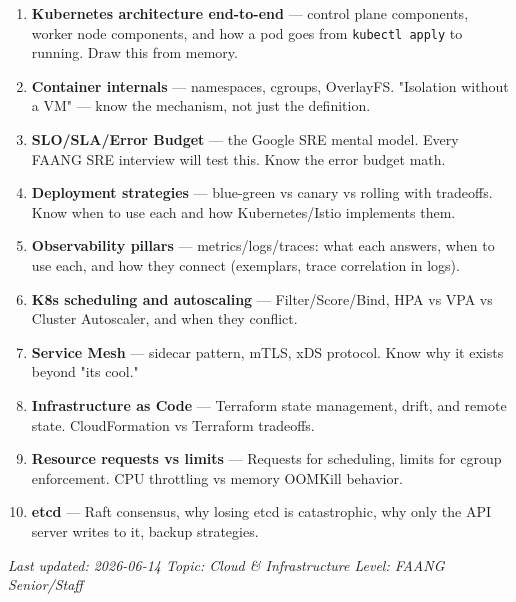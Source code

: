 \documentclass[11pt]{article}
\begin{document}
\begin{enumerate}
\def\labelenumi{\arabic{enumi}.}
\item
  \textbf{Kubernetes architecture end-to-end} --- control plane components, worker node components, and how a pod goes from \texttt{kubectl\ apply} to running. Draw this from memory.
\item
  \textbf{Container internals} --- namespaces, cgroups, OverlayFS. "Isolation without a VM" --- know the mechanism, not just the definition.
\item
  \textbf{SLO/SLA/Error Budget} --- the Google SRE mental model. Every FAANG SRE interview will test this. Know the error budget math.
\item
  \textbf{Deployment strategies} --- blue-green vs canary vs rolling with tradeoffs. Know when to use each and how Kubernetes/Istio implements them.
\item
  \textbf{Observability pillars} --- metrics/logs/traces: what each answers, when to use each, and how they connect (exemplars, trace correlation in logs).
\item
  \textbf{K8s scheduling and autoscaling} --- Filter/Score/Bind, HPA vs VPA vs Cluster Autoscaler, and when they conflict.
\item
  \textbf{Service Mesh} --- sidecar pattern, mTLS, xDS protocol. Know why it exists beyond "it\textquotesingle s cool."
\item
  \textbf{Infrastructure as Code} --- Terraform state management, drift, and remote state. CloudFormation vs Terraform tradeoffs.
\item
  \textbf{Resource requests vs limits} --- Requests for scheduling, limits for cgroup enforcement. CPU throttling vs memory OOMKill behavior.
\item
  \textbf{etcd} --- Raft consensus, why losing etcd is catastrophic, why only the API server writes to it, backup strategies.
\end{enumerate}

\emph{Last updated: 2026-06-14 \textbar{} Topic: Cloud \& Infrastructure \textbar{} Level: FAANG Senior/Staff}
\end{document}
